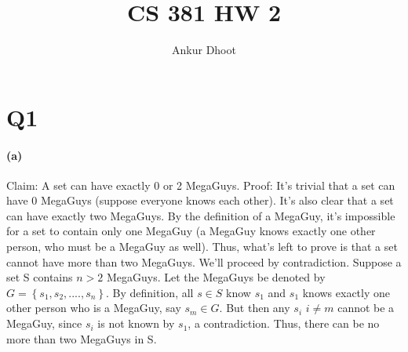 \documentclass[11pt,a4paper]{article}
\begin{document}
\author{Ankur Dhoot}
\title{CS 381 HW 2}
\maketitle

\section{Q1}

	\paragraph{(a)}
	Claim: A set can have exactly 0 or 2 MegaGuys. \newline
	Proof: It's trivial that a set can have 0 MegaGuys (suppose everyone knows each other). It's also clear that a set can have exactly two MegaGuys. By the definition of a MegaGuy, it's impossible for a set to contain only one MegaGuy (a MegaGuy knows exactly one other person, who must be a MegaGuy as well). Thus, what's left to prove is that a set cannot have more than two MegaGuys. We'll proceed by contradiction. Suppose a set S contains $n > 2$ MegaGuys. Let the MegaGuys be denoted by $G = \left\{s_{1}, s_{2}, ...., s_{n}\right\}$. By definition, all $s \in S$ know $s_{1}$ and $s_{1}$ knows exactly one other person who is a MegaGuy, say $s_{m} \in G$. But then any $s_{i}$ $i \neq m$ cannot be a MegaGuy, since $s_{i}$ is not known by $s_{1}$, a contradiction. Thus, there can be no more than two MegaGuys in S.
	
\end{document}
